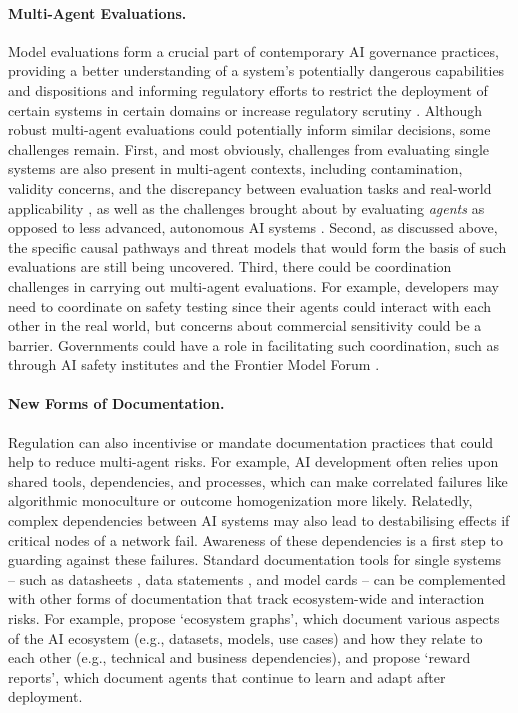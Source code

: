 \paragraph{Multi-Agent Evaluations.}
Model evaluations form a crucial part of contemporary AI governance practices, providing a better understanding of a system's potentially dangerous capabilities and dispositions \citep{Shevlane2023,kinniment2023evaluating,reuel2024open,hardy2024more, chen-etal-2024-llmarena} and informing regulatory efforts to restrict the deployment of certain systems in certain domains or increase regulatory scrutiny \citep[as in, for example, Article 51 of the EU AI Act,]{euaiact2024}.
Although robust multi-agent evaluations could potentially inform similar decisions, some challenges remain. 
First, and most obviously, challenges from evaluating single systems are also present in multi-agent contexts, including contamination, validity concerns, and the discrepancy between evaluation tasks and real-world applicability \citep{reuel_hardy_2024,hardy2024more}, as well as the challenges brought about by evaluating \textit{agents} as opposed to less advanced, autonomous AI systems \citep{Kapoor2024,siegel2024core,Stroebl2025}.
Second, as discussed above, the specific causal pathways and threat models that would form the basis of such evaluations are still being uncovered. 
Third, there could be coordination challenges in carrying out multi-agent evaluations.
For example, developers may need to coordinate on safety testing since their agents could interact with each other in the real world, but concerns about commercial sensitivity could be a barrier.
Governments could have a role in facilitating such coordination, such as through AI safety institutes and the Frontier Model Forum \citep{thurnherr2025who}. 

\paragraph{New Forms of Documentation.}
Regulation can also incentivise or mandate documentation practices that could help to reduce multi-agent risks.
For example, AI development often relies upon shared tools, dependencies, and processes, which can make correlated failures like algorithmic monoculture \citep{kleinberg_algorithmic_2021} or outcome homogenization \citep{bommasani_picking_2022} more likely. 
Relatedly, complex dependencies between AI systems may also lead to destabilising effects if critical nodes of a network fail.
Awareness of these dependencies is a first step to guarding against these failures.
Standard documentation tools for single systems -- such as datasheets \citep{gebru_datasheets_2021}, data statements \citep{bender_data_2018}, and model cards \citep{Mitchell2019} -- can be complemented with other forms of documentation that track ecosystem-wide and interaction risks.
For example, \citet{Bommasani2023} propose `ecosystem graphs', which document various aspects of the AI ecosystem (e.g., datasets, models, use cases) and how they relate to each other (e.g., technical and business dependencies), and \citet{gilbert_reward_2023} propose `reward reports', which document agents that continue to learn and adapt after deployment. 



